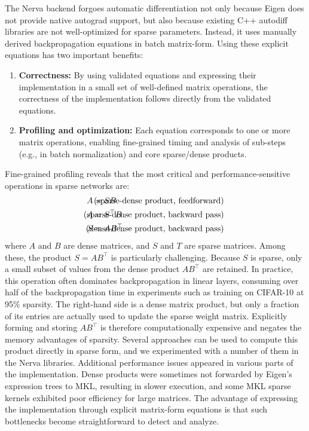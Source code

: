 \documentclass[twoside,11pt]{article}
\begin{document}
The Nerva backend forgoes automatic differentiation not only because Eigen does not provide native autograd support, but also because existing C++ autodiff libraries are not well-optimized for sparse parameters. Instead, it uses manually derived backpropagation equations in batch matrix-form.
Using these explicit equations has two important benefits:
\begin{enumerate}
\item \textbf{Correctness:} By using validated equations and expressing their implementation in a small set of well-defined matrix operations, the correctness of the implementation follows directly from the validated equations.
\item \textbf{Profiling and optimization:} Each equation corresponds to one or more matrix operations, enabling fine-grained timing and analysis of sub-steps (e.g., in batch normalization) and core sparse/dense products.
\end{enumerate}
Fine-grained profiling reveals that the most critical and performance-sensitive operations in sparse networks are:
\begin{align*}
A &= S B &\hspace{-2cm} \text{(sparse-dense product, feedforward)} \\
A &= S^\top B &\hspace{-2cm} \text{(sparse-dense product, backward pass)} \\
S &= A B^\top &\hspace{-2cm} \text{(dense-dense product, backward pass)}
\end{align*}
where $A$ and $B$ are dense matrices, and $S$ and $T$ are sparse matrices. Among these, the product $S = A B^\top$ is particularly challenging. Because $S$ is sparse, only a small subset of values from the dense product $A B^\top$ are retained. In practice, this operation often dominates backpropagation in linear layers, consuming over half of the backpropagation time in experiments such as training on CIFAR-10 at 95\% sparsity. The right-hand side is a dense matrix product, but only a fraction of its entries are actually used to update the sparse weight matrix. Explicitly forming and storing $AB^\top$ is therefore computationally expensive and negates the memory advantages of sparsity. Several approaches can be used to compute this product directly in sparse form, and we experimented with a number of them in the Nerva libraries.
Additional performance issues appeared in various parts of the implementation. Dense products were sometimes not forwarded by Eigen’s expression trees to MKL, resulting in slower execution, and some MKL sparse kernels exhibited poor efficiency for large matrices. The advantage of expressing the implementation through explicit matrix-form equations is that such bottlenecks become straightforward to detect and analyze.
\end{document}
